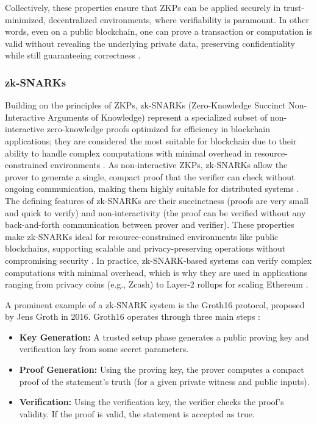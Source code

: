 \vspace{12pt}

Collectively, these properties ensure that ZKPs can be applied securely in trust-minimized, decentralized environments, where verifiability is paramount. In other words, even on a public blockchain, one can prove a transaction or computation is valid without revealing the underlying private data, preserving confidentiality while still guaranteeing correctness \cite{Cha24,DWF25}.

\subsubsection{zk-SNARKs}
\vspace{12pt}

Building on the principles of ZKPs, zk-SNARKs (Zero-Knowledge Succinct Non-Interactive Arguments of Knowledge) represent a specialized subset of non-interactive zero-knowledge proofs optimized for efficiency in blockchain applications; they are considered the most suitable for blockchain due to their ability to handle complex computations with minimal overhead in resource-constrained environments \cite{Gro16,Sta24}. As non-interactive ZKPs, zk-SNARKs allow the prover to generate a single, compact proof that the verifier can check without ongoing communication, making them highly suitable for distributed systems \cite{FS86}. The defining features of zk-SNARKs are their succinctness (proofs are very small and quick to verify) and non-interactivity (the proof can be verified without any back-and-forth communication between prover and verifier). These properties make zk-SNARKs ideal for resource-constrained environments like public blockchains, supporting scalable and privacy-preserving operations without compromising security \cite{Cha24,Gro16}. In practice, zk-SNARK-based systems can verify complex computations with minimal overhead, which is why they are used in applications ranging from privacy coins (e.g., Zcash) to Layer-2 rollups for scaling Ethereum \cite{Cyr24}.

\vspace{12pt}

A prominent example of a zk-SNARK system is the Groth16 protocol, proposed by Jens Groth in 2016. Groth16 operates through three main steps \cite{Gro16,Lav23}:

\vspace{12pt}

\begin{itemize}
    \item \textbf{Key Generation:} A trusted setup phase generates a public proving key and verification key from some secret parameters.
    \item \textbf{Proof Generation:} Using the proving key, the prover computes a compact proof of the statement’s truth (for a given private witness and public inputs).
    \item \textbf{Verification:} Using the verification key, the verifier checks the proof’s validity. If the proof is valid, the statement is accepted as true.
\end{itemize}

